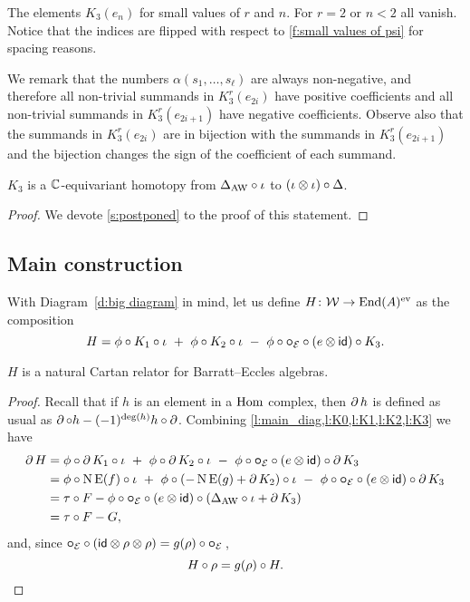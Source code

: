 \begin{table}
	\centering
	
	\caption{The elements $K_3(e_n)$ for small values of $r$ and $n$. For $r=2$ or $n<2$ all vanish. Notice that the indices are flipped with respect to \cref{f:small values of psi} for spacing reasons.}
	\label{f:small values of K}
\end{table}

We remark that the numbers $\alpha(s_1,\ldots,s_\ell)$ are always non-negative, and therefore all non-trivial summands in $K_3^r(e_{2i})$ have positive coefficients and all non-trivial summands in $K_3^r(e_{2i+1})$ have negative coefficients.
Observe also that the summands in $K_3^r(e_{2i})$ are in bijection with the summands in $K_3^r(e_{2i+1})$ and the bijection changes the sign of the coefficient of each summand.

\begin{lemma}\label{l:K3}
	$K_3$ is a $\mathbb{C}$-equivariant homotopy from $\Delta_{\operatorname{AW}} \mathbin{\circ} \iota$ to $(\iota \otimes \iota) \mathbin{\circ} \Delta$.
\end{lemma}

\begin{proof}
	We devote \cref{s:postponed} to the proof of this statement.
\end{proof}

\subsection{Main construction}

With Diagram~\eqref{d:big diagram} in mind, let us define $H \colon \mathcal{W} \to \mathrm{End}(A)^{\mathrm{ev}}$ as the composition
\[
H = \phi \mathbin{\circ} K_1 \mathbin{\circ} \iota \ +\ \phi \mathbin{\circ} K_2 \mathbin{\circ} \iota \ -\ \phi \mathbin{\circ} \bm{\mathbin{\circ}}_{\mathcal{E}} \mathbin{\circ} (e \otimes \mathsf{id}) \mathbin{\circ} K_3.
\]

\begin{theorem}
	$H$ is a natural Cartan relator for Barratt--Eccles algebras.
\end{theorem}

\begin{proof}
	Recall that if $h$ is an element in a $\mathrm{Hom}$ complex, then $\operatorname{\partial} h$ is defined as usual as $\operatorname{\partial} \mathbin{\circ} h - (-1)^{\deg(h)} h \mathbin{\circ} \operatorname{\partial}$.
	Combining \cref{l:main_diag,l:K0,l:K1,l:K2,l:K3} we have
	\begin{align*}
		\operatorname{\partial} H &=
		\phi \mathbin{\circ} \operatorname{\partial} K_1 \mathbin{\circ} \iota \ +\
		\phi \mathbin{\circ} \operatorname{\partial} K_2 \mathbin{\circ} \iota \ -\
		\phi \mathbin{\circ} \bm{\mathbin{\circ}}_{\mathcal{E}} \mathbin{\circ} (e \otimes \mathsf{id}) \mathbin{\circ} \operatorname{\partial} K_3 \\ &=
		\phi \mathbin{\circ} \operatorname{N}\operatorname{E}(f) \mathbin{\circ} \iota \ +\
		\phi \mathbin{\circ} (-\operatorname{N}\operatorname{E}(g) + \operatorname{\partial} K_2) \mathbin{\circ} \iota \ -\
		\phi \mathbin{\circ} \bm{\mathbin{\circ}}_{\mathcal{E}} \mathbin{\circ} (e \otimes \mathsf{id}) \mathbin{\circ} \operatorname{\partial} K_3 \\ &=
		\tau \mathbin{\circ} F - \phi \mathbin{\circ} \bm{\mathbin{\circ}}_{\mathcal{E}} \mathbin{\circ} (e \otimes \mathsf{id}) \mathbin{\circ} (\Delta_{\operatorname{AW}} \mathbin{\circ} \iota + \operatorname{\partial} K_3) \\ &=
		\tau \mathbin{\circ} F - G,
	\end{align*}
	and, since $\bm{\mathbin{\circ}}_{\mathcal{E}} \mathbin{\circ} (\mathsf{id} \otimes \rho \otimes \rho) = g(\rho) \mathbin{\circ} \bm{\mathbin{\circ}}_{\mathcal{E}}$\,,
	\[
	H \mathbin{\circ} \rho = g(\rho) \mathbin{\circ} H. \qedhere
	\]
\end{proof}